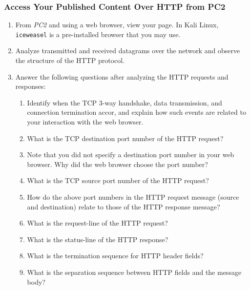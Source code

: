 \documentclass[pdftex,12pt,a4paper]{article}
\begin{document}
            \subsubsection{Access Your Published Content Over HTTP from PC2}
                \begin{enumerate}
                    \item From \emph{PC2} and using a web browser, view your
                    page. In Kali Linux, \texttt{iceweasel} is a pre-installed
                    browser that you may use.

                    \item Analyze transmitted and received datagrams over the
                    network and observe the structure of the HTTP protocol.

                    \item Answer the following questions after analyzing the
                    HTTP requests and responses:
                        \begin{enumerate}
                            \item Identify when the TCP 3-way handshake, data
                                transmission, and connection termination accor,
                                and explain how such events are related to your
                                interaction with the web browser.
                            \item What is the TCP destination port number of
                            the HTTP request?
                            \item Note that you did not specify a destination
                            port number in your web browser. Why did the web
                            browser choose the port number?
                            \item What is the TCP source port number of the
                            HTTP request?
                            \item How do the above port numbers in the HTTP
                            request message (source and destination) relate to
                            those of the HTTP response message?
                            \item What is the request-line of the HTTP request?
                            \item What is the status-line of the HTTP response?
                            \item What is the termination sequence for HTTP
                            header fields?
                            \item What is the separation sequence between HTTP
                            fields and the message body?
                        \end{enumerate}
                \end{enumerate}
\end{document}
